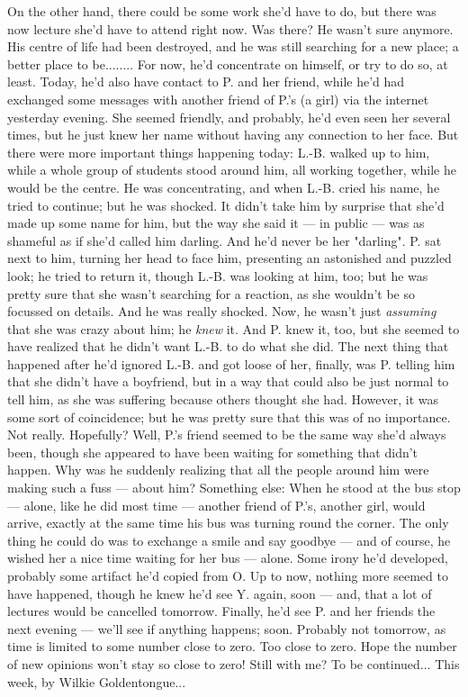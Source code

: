 On the other hand, there could be some work she'd have to do, but there was now lecture she'd have to attend right now. Was there? He wasn't sure anymore. 
His centre of life had been destroyed, and he was still searching for a new place; a better place to be........
For now, he'd concentrate on himself, or try to do so, at least. Today, he'd also have contact to P. and her friend, while he'd had exchanged some messages with another friend of P.'s (a girl) via the internet yesterday evening. She seemed friendly, and probably, he'd even seen her several times, but he just knew her name without having any connection to her face. 
But there were more important things happening today: L.-B. walked up to him, while a whole group of students stood around him, all working together, while he would be the centre. He was concentrating, and when L.-B. cried his name, he tried to continue; but he was shocked. It didn't take him by surprise that she'd made up some name for him, but the way she said it --- in public --- was as shameful as if she'd called him darling. 
And he'd never be her "darling". P. sat next to him, turning her head to face him, presenting an astonished and puzzled look; he tried to return it, though L.-B. was looking at him, too; but he was pretty sure that she wasn't searching for a reaction, as she wouldn't be so focussed on details. And he was really shocked. 
Now, he wasn't just \emph{assuming} that she was crazy about him; he \emph{knew} it. 
And P. knew it, too, but she seemed to have realized that he didn't want L.-B. to do what she did. 
The next thing that happened after he'd ignored L.-B. and got loose of her, finally, was P. telling him that she didn't have a boyfriend, but in a way that could also be just normal to tell him, as she was suffering because others thought she had. 
However, it was some sort of coincidence; but he was pretty sure that this was of no importance. 
Not really. 
Hopefully?
Well, P.'s friend seemed to be the same way she'd always been, though she appeared to have been waiting for something that didn't happen. Why was he suddenly realizing that all the people around him were making such a fuss --- about him?
Something else: When he stood at the bus stop --- alone, like he did most time --- another friend of P.'s, another girl, would arrive, exactly at the same time his bus was turning round the corner. The only thing he could do was to exchange a smile and say goodbye --- and of course, he wished her a nice time waiting for her bus --- alone. 
Some irony he'd developed, probably some artifact he'd copied from O. 
Up to now, nothing more seemed to have happened, though he knew he'd see Y. again, soon --- and, that a lot of lectures would be cancelled tomorrow. 
Finally, he'd see P. and her friends the next evening --- we'll see if anything happens; soon. 
Probably not tomorrow, as time is limited to some number close to zero. 
Too close to zero. 
Hope the number of new opinions won't stay so close to zero!
Still with me?
To be continued...
This week, by Wilkie Goldentongue...

